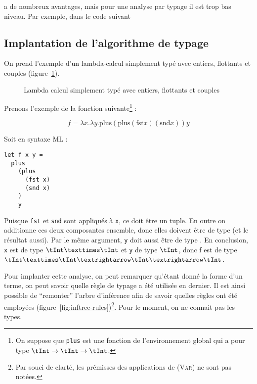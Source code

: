 \newspeak{} a de nombreux avantages, mais pour une analyse par typage il est
trop bas niveau. Par exemple, dans le code suivant



\subsection{Implantation de l'algorithme de typage}

On prend l'exemple d'un lambda-calcul simplement typé avec entiers, flottants et
couples (figure~\ref{fig:stlc}).

\begin{figure}



\caption{Lambda calcul simplement typé avec entiers, flottants et couples}
\label{fig:stlc}

\end{figure}

Prenons l'exemple de la fonction suivante\footnote{ On suppose que \texttt{plus}
est une fonction de l'environnement global qui a pour type $\tInt \rightarrow
\tInt \rightarrow \tInt$.} :

\[
f = λx.λy. \textrm{plus} (\textrm{plus} (\textrm{fst} x) (\textrm{snd} x)) y
\]

Soit en syntaxe ML :

\begin{Verbatim}
let f x y =
  plus
    (plus
      (fst x)
      (snd x)
    )
    y
\end{Verbatim}

Puisque \texttt{fst} et \texttt{snd} sont appliqués à \texttt{x}, ce doit être
un tuple. En outre on additionne ces deux composantes ensemble, donc elles
doivent être de type \tInt (et le résultat aussi). Par le même argument,
\texttt{y} doit aussi être de type \tInt. En conclusion, \texttt{x} est de type
$\tInt × \tInt$ et \texttt{y} de type $\tInt$, donc f est de type $\tInt × \tInt
→ \tInt → \tInt$.

Pour implanter cette analyse, on peut remarquer qu'étant donné la forme d'un
terme, on peut savoir quelle règle de typage a été utilisée en dernier. Il est
ainsi possible de ``remonter'' l'arbre d'inférence afin de savoir quelles règles
ont été employées (figure~\ref{fig:inftree-rules})\footnote{Par souci de clarté,
les prémisses des applications de \textsc{(Var)} ne sont pas notées.}. Pour le
moment, on ne connait pas les types.

